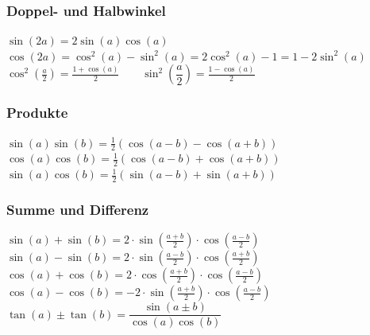 \subsubsection{Doppel- und Halbwinkel}	
		$\sin(2a)=2\sin(a)\cos(a)$\\
		$\cos(2a)=\cos^2(a)-\sin^2(a)=2\cos^2(a)-1=1-2\sin^2(a)$\\
		$\cos^2 \left(\frac{a}{2}\right)=\frac{1+\cos(a)}{2} \qquad
		\sin^2 \left(\dfrac{a}{2}\right)=\frac{1-\cos(a)}{2}$
		
\subsubsection{Produkte}
		$\sin(a)\sin(b)=\frac{1}{2}(\cos(a-b)-\cos(a+b))$\\
		$\cos(a)\cos(b)=\frac{1}{2}(\cos(a-b)+\cos(a+b))$\\
		$\sin(a)\cos(b)=\frac{1}{2}(\sin(a-b)+\sin(a+b))$
		
\subsubsection{Summe und Differenz}
		$\sin(a)+\sin(b)=2 \cdot \sin \left(\frac{a+b}{2}\right) \cdot
		\cos\left(\frac{a-b}{2}\right)$\\
		$\sin(a)-\sin(b)=2 \cdot \sin \left(\frac{a-b}{2}\right) \cdot
		\cos\left(\frac{a+b}{2}\right)$\\
		$\cos(a)+\cos(b)=2 \cdot \cos \left(\frac{a+b}{2}\right) \cdot
		\cos\left(\frac{a-b}{2}\right)$\\
		$\cos(a)-\cos(b)=-2 \cdot \sin \left(\frac{a+b}{2}\right) \cdot
		\cos\left(\frac{a-b}{2}\right)$\\
		$\tan(a) \pm \tan(b)=\dfrac{\sin(a \pm b)}{\cos(a)\cos(b)}$		
	

